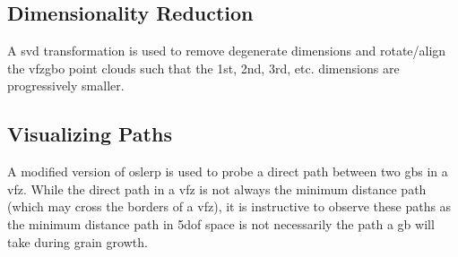 \documentclass[final,twocolumn,12pt]{elsarticle}
\begin{document}
%	
%	
%	
%	
%	

    \subsection{Dimensionality Reduction}
    A \gls{svd} transformation is used to remove degenerate dimensions and rotate/align the \gls{vfzgbo} point clouds such that the 1st, 2nd, 3rd, etc. dimensions are progressively smaller.

	\subsection{Visualizing  Paths} \label{sec:methods:path}
	A modified version of \gls{oslerp} is used to probe a direct path between two \glspl{gb} in a \gls{vfz}. While the direct path in a \gls{vfz} is not always the minimum distance path (which may cross the borders of a \gls{vfz}), it is instructive to observe these paths as the minimum distance path in \gls{5dof} space is not necessarily the path a \gls{gb} will take during grain growth.
	
\end{document}
